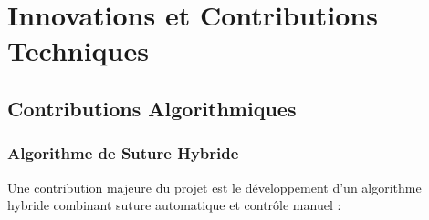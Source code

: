 \documentclass[12pt,a4paper]{report}
\begin{document}
\section{Innovations et Contributions Techniques}

\subsection{Contributions Algorithmiques}

\subsubsection{Algorithme de Suture Hybride}

Une contribution majeure du projet est le développement d'un algorithme hybride combinant suture automatique et contrôle manuel :
\end{document}
